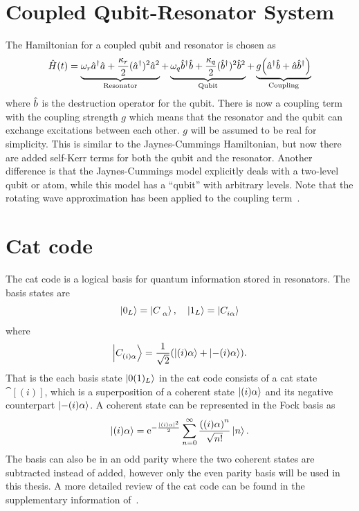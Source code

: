 \documentclass[main.tex]{subfiles}
\begin{document}
\section{Coupled Qubit-Resonator System}
The Hamiltonian for a coupled qubit and resonator is chosen as
\begin{equation}
    \Ham(t) = \underbrace{\omega_{r}\au\ad + \frac{\kappa_r}{2}(\au)^2\ad^2}_{\text{Resonator}} + \underbrace{\omega_{q}\bu\bd + \frac{\kappa_q}{2}(\bu)^2\bd^2}_{\text{Qubit}} + \underbrace{g\qty(\au\bd+\ad\bu)}_{\text{Coupling}}
    \label{eq:hamiltonian-coupled}
\end{equation}
where \( \bd \) is the destruction operator for the qubit.
There is now a coupling term with the coupling strength \(g\) which means that the resonator and the qubit can exchange excitations between each other.
\(g\) will be assumed to be real for simplicity.
This is similar to the Jaynes-Cummings Hamiltonian, but now there are added self-Kerr terms for both the qubit and the resonator.
Another difference is that the Jaynes-Cummings model explicitly deals with a two-level qubit or atom, while this model has a ``qubit'' with arbitrary levels.
Note that the rotating wave approximation has been applied to the coupling term~\cite{wu_strong-coupling_2007}.

\section{Cat code}
The cat code is a logical basis for quantum information stored in resonators.
The basis states are
\begin{equation}
    \ket{0_L} = \cat{},\quad \ket{1_L} = \cat[i]{}
\end{equation}
where 
\begin{equation}
    \cat[(i)]{} = \frac{1}{\sqrt{2}}\qty(\ket{(i)\alpha} + \ket{-(i)\alpha}).
\end{equation}
That is the each basis state \( \ket{0(1)_L} \) in the cat code consists of a cat state \(\cat[(i)]{}\), which is a superposition of a coherent state \(\ket{(i)\alpha}\) and its negative counterpart \(\ket{-(i)\alpha}\).
A coherent state can be represented in the Fock basis as
\begin{equation}
    \ket{(i)\alpha} =\ex^{-{\frac{|(i)\alpha|^2}{2}}}\sum_{n=0}^{\infty}{\frac{\qty((i)\alpha)^n}{\sqrt{n!}}}\ket{n}.
\end{equation}
The basis can also be in an odd parity where the two coherent states are subtracted instead of added, however only the even parity basis will be used in this thesis.
A more detailed review of the cat code can be found in the supplementary information of~\cite{ofek_extending_2016}.
\end{document}

